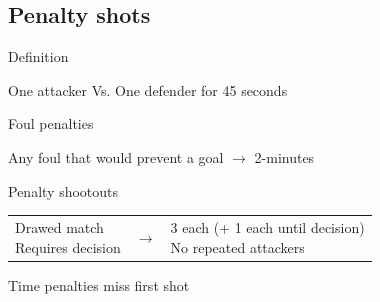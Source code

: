 \documentclass{beamer}
\begin{document}
    \subsection{Penalty shots}

    \begin{frame}{Definition}
        \begin{center}
            One attacker Vs. One defender for 45 seconds
        \end{center}
    \end{frame}

    \begin{frame}{Foul penalties}
        \begin{center}
            Any foul that would prevent a goal \pause $\rightarrow$ 2-minutes
        \end{center}
    \end{frame}

    \begin{frame}{Penalty shootouts}
        \begin{tabular}{lcl}
            \parbox{0.4\textwidth}
            {
                Drawed match \\
                Requires decision
                \pause
            }
            &
            $\rightarrow$
            &
            \parbox{0.4\textwidth}
            {
                3 each (+ 1 each until decision) \\
                No repeated attackers
            }
        \end{tabular}

        \pause

        \begin{center}
            Time penalties miss first shot
        \end{center}
    \end{frame}
\end{document}
